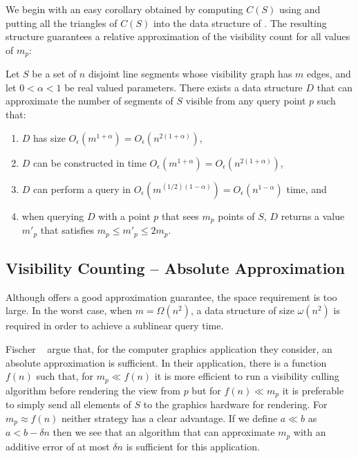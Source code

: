 \documentclass{patmorin}
\newcommand{\Oe}{O_\epsilon}
\begin{document}
We begin with an easy corollary obtained by computing $C(S)$ using
 and putting all the triangles of $C(S)$ into the
data structure of .  The resulting structure
guarantees a relative approximation of the visibility count for all values
of $m_p$:

\begin{cor}
  Let $S$ be a set of $n$ disjoint line segments whose visibility graph
  has $m$ edges, and let $0 < \alpha < 1$ be real valued
  parameters.  There exists a data structure $D$ that can approximate
  the number of segments of $S$ visible from any query point $p$ such that:
  \begin{enumerate}
   \item $D$ has size $\Oe(m^{1+\alpha}) = \Oe(n^{2(1+\alpha)})$,
   \item $D$ can be constructed in time $\Oe(m^{1+\alpha}) = \Oe(n^{2(1+\alpha)})$,
   \item $D$ can perform a query in $\Oe(m^{(1/2)(1-\alpha)}) =
          \Oe(n^{1-\alpha})$ time, and
   \item when querying $D$ with a point $p$ that sees $m_p$ points of
          $S$, $D$ returns a value $m'_p$ that satisfies $m_p \le m'_p
          \le 2m_p$.
  \end{enumerate}
\end{cor}

\subsection{Visibility Counting -- Absolute Approximation} 

Although  offers a good approximation guarantee, the
space requirement is too large.  In the worst case, when $m=\Omega(n^2)$,
a data structure of size $\omega(n^2)$ is required in order to achieve
a sublinear query time.

Fischer \etal\ \cite{fhjmz08,fhjmz09} argue that, for the computer
graphics application they consider, an absolute approximation is
sufficient.  In their application, there is a function $f(n)$ such that,
for $m_p\ll f(n)$ it is more efficient to run a visibility culling
algorithm before rendering the view from $p$ but for $f(n) \ll m_p$
it is preferable to simply send all elements of $S$ to the graphics
hardware for rendering.  For $m_p\approx f(n)$ neither strategy has a
clear advantage.  If we define $a \ll b$ as $a < b - \delta n$ then we
see that an algorithm that can approximate $m_p$ with an additive error
of at most $\delta n$ is sufficient for this application.
\end{document}
